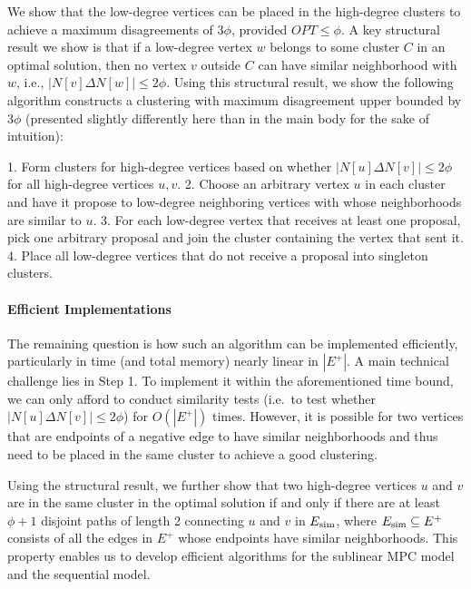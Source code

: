 We show that the low-degree vertices can be placed in the high-degree clusters to achieve a maximum disagreements of $3\phi$, provided $OPT \leq \phi$. A key structural result we show is that if a low-degree vertex $w$ belongs to some cluster $C$ in an optimal solution, then no vertex $v$ outside $C$ can have similar neighborhood with $w$, i.e., $|N[v] \Delta N[w]| \leq 2\phi$. Using this structural result, we show the following algorithm constructs a clustering with maximum disagreement upper bounded by $3\phi$ (presented slightly differently here than in the main body for the sake of intuition):

1. Form clusters for high-degree vertices based on whether $|N[u] \Delta N[v]| \leq 2\phi$ for all high-degree vertices $u,v$. 2. Choose an arbitrary vertex $u$ in each cluster and have it propose to low-degree neighboring vertices with whose neighborhoods are similar to $u$. 3. For each low-degree vertex that receives at least one proposal, pick one arbitrary proposal and join the cluster containing the vertex that sent it. 4. Place all low-degree vertices that do not receive a proposal into singleton clusters.

\paragraph{Efficient Implementations} 
The remaining question is how such an algorithm can be implemented efficiently, particularly in time (and total memory) nearly linear in $|E^{+}|$. A main technical challenge lies in Step 1. To implement it within the aforementioned time bound, we can only afford to conduct similarity tests (i.e.~to test whether $|N[u] \Delta N[v]| \leq 2\phi$) for $O(|E^{+}|)$ times. However, it is possible for two vertices that are endpoints of a negative edge to have similar neighborhoods and thus need to be placed in the same cluster to achieve a good clustering.

Using the structural result, we further show that two high-degree vertices $u$ and $v$ are in the same cluster in the optimal solution if and only if there are at least $\phi+1$ disjoint paths of length 2 connecting $u$ and $v$ in $E_{\operatorname{sim}}$, where $E_{\operatorname{sim}} \subseteq E^{+}$ consists of all the edges in $E^{+}$ whose endpoints have similar neighborhoods. This property enables us to develop efficient algorithms for the sublinear MPC model and the sequential model.

